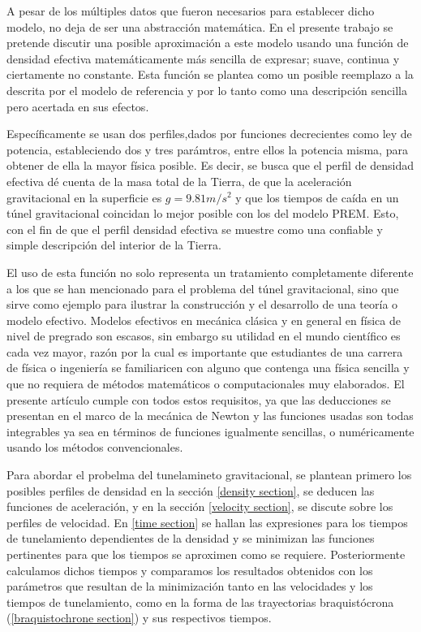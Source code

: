 \documentclass[aps,twocolumn,showpacs,preprintnumbers]{revtex4}
\begin{document}
    A pesar de los múltiples datos que fueron necesarios para establecer dicho modelo, no deja de ser una abstracción matemática. En el presente trabajo se pretende discutir una posible aproximación a este modelo usando una función de densidad efectiva matemáticamente más sencilla de expresar; suave, continua y ciertamente no constante. Esta función se plantea como un posible reemplazo a la descrita por el modelo de referencia y por lo tanto como una descripción sencilla pero acertada en sus efectos.
    
    Específicamente se usan dos perfiles,dados por funciones decrecientes como ley de potencia, estableciendo dos y tres parámtros, entre ellos la potencia misma, para obtener de ella la mayor física posible. Es decir, se busca que el perfil de densidad efectiva dé cuenta de la masa total de la Tierra, de que la aceleración gravitacional en la superficie es $g=9.81 m/s^2$ y que los tiempos de caída en un túnel gravitacional coincidan lo mejor posible con los del modelo PREM. Esto, con el fin de que el perfil densidad efectiva se muestre como una confiable y simple descripción del interior de la Tierra.
    
    El uso de esta función no solo representa un tratamiento completamente diferente a los que se han mencionado para el problema del túnel gravitacional, sino que sirve como ejemplo para ilustrar la construcción y el desarrollo de una teoría o modelo efectivo. Modelos efectivos en mecánica clásica y en general en física de nivel de pregrado son escasos, sin embargo su utilidad en el mundo científico es cada vez mayor, razón por la cual es importante que estudiantes de una carrera de física o ingeniería se familiaricen con alguno que contenga una física sencilla y que no requiera de métodos matemáticos o computacionales muy elaborados. El presente artículo cumple con todos estos requisitos, ya que las deducciones se presentan en el marco de la mecánica de Newton y las funciones usadas son todas integrables ya sea en términos de funciones igualmente sencillas, o numéricamente usando los métodos convencionales. 
    

    Para abordar el probelma del tunelamineto gravitacional, se plantean primero los posibles perfiles de densidad en la sección \ref{density section}, se deducen las funciones de aceleración, y en la sección \ref{velocity section}, se discute sobre los perfiles de velocidad. En \ref{time section} se hallan las expresiones para los tiempos de tunelamiento dependientes de la densidad y se minimizan las funciones pertinentes para que los tiempos se aproximen como se requiere. Posteriormente calculamos dichos tiempos y comparamos los resultados obtenidos con los parámetros que resultan de la minimización tanto en las velocidades y los tiempos de tunelamiento, como en la forma de las trayectorias braquistócrona (\ref{braquistochrone section}) y sus respectivos tiempos.
    
\end{document}
